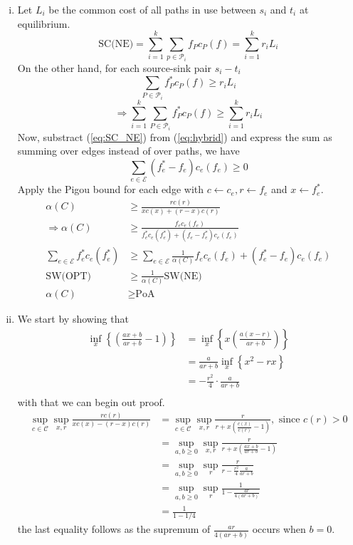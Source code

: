 \documentclass[a4paper,12pt]{article}
\theoremstyle{definition}
\begin{document}
\begin{enumerate}
\begin{enumerate}[(i)]
\item
Let $L_i$ be the common cost of all paths in use between $s_i$ and $t_i$ at equilibrium.
\begin{equation}\label{eq:SC_NE}
\text{SC(NE)} = \sum_{i=1}^{k}\sum_{p\in\mathcal{P}_i}f_Pc_P(f) = \sum_{i=1}^{k}r_iL_i 
\end{equation}
On the other hand, for each source-sink pair $s_i-t_i$
\[ \sum_{P\in\mathcal{P}_i}f^*_Pc_P(f)\geq r_iL_i \]
\begin{equation}\label{eq:hybrid}
\Rightarrow \sum_{i=1}^{k}\sum_{P\in\mathcal{P}_i}f^*_Pc_P(f)\geq \sum_{i=1}^{k}r_iL_i
\end{equation}
Now, substract (\ref{eq:SC_NE}) from (\ref{eq:hybrid}) and express the sum as summing over edges instead of over paths, we have
\begin{equation}\label{eq:hybrid2}
\sum_{e\in\mathcal{E}}(f_e^*-f_e)c_e(f_e) \geq 0
\end{equation}
Apply the Pigou bound for each edge with $c\leftarrow c_e, r \leftarrow f_e$ and $x \leftarrow f_e^*$.
\begin{align*}
	\alpha(C) &\geq \frac{rc(r)}{xc(x)+(r-x)c(r)}\\
	\Rightarrow 	\alpha(C) &\geq \frac{f_ec_e(f_e)}{f_e^*c_e(f_e^*)+(f_e-f_e^*)c_e(f_e)}\\
	\sum_{e \in \mathcal{E}}f_e^*c_e(f_e^*) & \geq \sum_{e \in \mathcal{E}} \frac{1}{\alpha(C)}f_ec_e(f_e) + (f_e^* - f_e)c_e(f_e)\\
	\text{SW(OPT)} &\geq \frac{1}{\alpha(C)}\text{SW(NE)}\\
	\alpha(C) &\geq \text{PoA}
\end{align*}

\item We start by showing that 
\begin{align*}
\inf_{x}\left\{\left(\frac{ax+b}{ar+b}-1\right)\right\}&=\inf_{x}\left\{x\left(\frac{a(x-r)}{ar+b}\right)\right\}\\
&=\frac{a}{ar+b}\inf_{x}\left\{x^2-rx\right\}\\
&=-\frac{r^2}{4}\cdot\frac{a}{ar+b}\\
\end{align*}
with that we can begin out proof.
\begin{align*}
\sup_{c\in \mathcal{C}}\sup_{x,r}\frac{rc(r)}{x c(x)-(r-x)c(r)}&=\sup_{c\in \mathcal{C}}\sup_{x,r}\frac{r}{r +x\left(\frac{c(x)}{c(r)}-1\right)}, \text{ since $c(r)>0$}
\\
&=\sup_{a,b\geq0}\sup_{x,r}\frac{r}{r +x\left(\frac{ax+b}{ar+b}-1\right)}\\
&=\sup_{a,b\geq0}\sup_{r}\frac{r}{r -\frac{r^2}{4}\frac{a}{ar+b}}\\
&=\sup_{a,b\geq0}\sup_{r}\frac{1}{1 -\frac{ar}{4(ar+b)}}\\
&=\frac{1}{1-1/4}
\end{align*}
the last equality follows as the supremum of $\frac{ar}{4(ar+b)}$ occurs when $b=0$.
\end{enumerate}


\end{enumerate}
\end{document}
